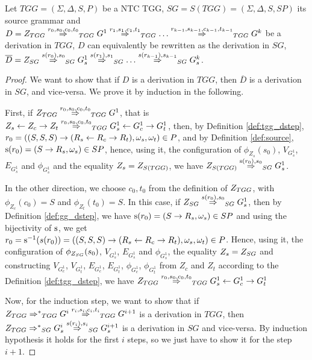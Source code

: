 \documentclass[]{report}
\begin{document}
\begin{theorem}
	\label{thm:one_d_enough}
	Let $TGG = (\Sigma, \Delta, S, P)$ be a NTC TGG, $SG = S(TGG) = (\Sigma, \Delta, S, SP)$ its source grammar and $D = \startTG{TGG} \tderiv{r_0}{s_0,c_0,t_0}{TGG} G^1 \tderiv{r_1}{s_1,c_1,t_1}{TGG} \dots \tderiv{r_{k-1}}{s_{k-1},c_{k-1},t_{k-1}}{TGG} G^k$ be a derivation in $TGG$, $D$ can equivalently be rewritten as the derivation in $SG$, $\overline{D} = \startG{SG} \deriv{s(r_0)}{s_0}{SG} G^1_s \deriv{s(r_1)}{s_1}{SG} \dots \deriv{s(r_{k-1})}{s_{k-1}}{SG} G^k_s $.
\end{theorem}
\begin{proof}
	We want to show that if $D$ is a derivation in $TGG$, then $\overline{D}$ is a derivation in $SG$, and vice-versa. We prove it by induction in the following.
	
	First, if $\startTG{TGG} \tderiv{r_0}{s_0,c_0,t_0}{TGG} G^1$, that is $Z_s \ms{} Z_c \mt{} Z_t \tderiv{r_0}{s_0,c_0,t_0}{TGG} G^1_s \ms{} G^1_c \mt{} G^1_t$, then, by Definition \ref{def:tgg_dstep}, $r_0 = ((S,S,S) \to (R_s \overset{}{\leftarrow} R_c \overset{}{\rightarrow} R_t), \omega_s, \omega_t) \in P$, and by Definition \ref{def:source}, $\operatorname{s}(r_0) = (S \to R_s, \omega_s) \in SP$, hence, using it, the configuration of $\phi_{Z_s}(s_0)$, $V_{G^1_s}$, $E_{G^1_s}$ and $\phi_{G^1_s}$ and the equality $Z_s = Z_{S(TGG)}$, we have $\startG{S(TGG)} \deriv{\source(r_0)}{s_0}{SG} G^1_s$.
	
	In the other direction, we choose $c_0, t_0$ from the definition of $Z_{TGG}$, with $\phi_{Z_c}(c_0) = S$ and  $\phi_{Z_t}(t_0) = S$. In this case, if $\startG{SG} \deriv{s(r_0)}{s_0}{SG} G^1_s$, then by Definition \ref{def:gg_dstep}, we have $\operatorname{s}(r_0) = (S \to R_s, \omega_s) \in SP$ and using the bijectivity of $\operatorname{s}$, we get $r_0 = \operatorname{s}^{-1}(s(r_0)) = ((S,S,S) \to (R_s \overset{}{\leftarrow} R_c \overset{}{\rightarrow} R_t), \omega_s, \omega_t) \in P$. Hence, using it, the configuration of $\phi_{Z_{SG}}(s_0)$, $V_{G^1_s}$, $E_{G^1_s}$ and $\phi_{G^1_s}$, the equality $Z_s = Z_{SG}$ and constructing $V_{G^1_c}$, $V_{G^1_t}$, $E_{G^1_c}$, $E_{G^1_t}$, $\phi_{G^1_c}$, $\phi_{G^1_t}$ from $Z_c$ and $Z_t$ according to the Definition \ref{def:tgg_dstep}, we have $\startTG{TGG} \tderiv{r_0}{s_0,c_0,t_0}{TGG} G^1_s \ms{} G^1_c \mt{} G^1_t$
	
	Now, for the induction step, we want to show that if $\startTG{TGG} \tderivtr{}{}{TGG} G^i \tderiv{r_{i}}{s_{i},c_{i},t_{i}}{TGG} G^{i+1}$ is a derivation in $TGG$, then $\startG{TGG} \derivtr{}{}{SG} G^i_s \deriv{s(r_{i})}{s_{i}}{SG} G^{i+1}_s$ is a derivation in $SG$ and vice-versa. By induction hypothesis it holds for the first $i$ steps, so we just have to show it for the step $i+1$.
	

\end{proof}
\end{document}
